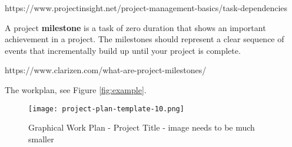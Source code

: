 https://www.projectinsight.net/project-management-basics/task-dependencies

A project \textbf{milestone} is a task of zero duration that shows an important achievement in a project. The milestones should represent a clear sequence of events that incrementally build up until your project is complete.

https://www.clarizen.com/what-are-project-milestones/

The workplan, see Figure \ref{fig:example}. 

\begin{figure}[ht]
\centering\texttt{[image: project-plan-template-10.png]}
\caption{Graphical Work Plan - Project Title - image needs to be much smaller}
\label{fig:workplan}
\end{figure}